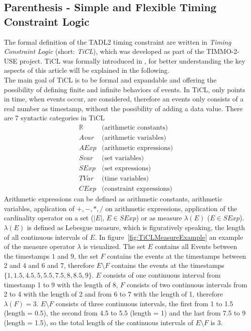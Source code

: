\subsection{Parenthesis - Simple and Flexible Timing Constraint Logic}
	The formal definition of the TADL2 timing constraint are written in \emph{Timing Constraint Logic} (short: \emph{TiCL}), which was developed as part of the TIMMO-2-USE project. TiCL was formally introduced in \cite{TiCL}, for better understanding the key aspects of this article will be explained in the following.\\
	The main goal of TiCL is to be formal and expandable and offering the possibility of defining finite and infinite behaviors of events. In TiCL, only points in time, when events occur, are considered, therefore an events only consists of a real number as timestamp, without the possibility of adding a data value. There are 7 syntactic categories in TiCL
	\begin{align*}
		\mathbb{R} &\text{(arithmetic constants)}\\
		Avar &\text{(arithmetic variables)}\\
		AExp &\text{(arithmetic expressions)}\\[10pt]
		Svar &\text{(set variables)}\\
		SExp &\text{(set expressions)}\\[10pt]
		TVar &\text{(time variables)}\\
		CExp &\text{(constraint expressions)}
	\end{align*}
	Arithmetic expressions can be defined as arithmetic constants, arithmetic variables, application of $+,-,*,/$ on arithmetic expressions, application of the cardinality operator on a set ($|E|$, $E\in SExp$) or as measure $\lambda(E)$ ($E\in SExp$). $\lambda(E)$ is defined as Lebesgue measure, which is figuratively speaking, the length of all continuous intervals of $E$. In figure~\ref{fig:TiCLMeasureExample} an example of the measure operator $\lambda$ is visualized. The set $E$ contains all Events between the timestamps $1$ and $9$, the set $F$ contains the events at the timestamps between 2 and 4 and 6 and 7, therefore $E\setminus F$ contains the events at the timestamps $\{1, 1.5, 4.5, 5, 5.5, 7.5, 8, 8.5, 9\}$.
	$E$ consists of one continuous interval from timestamp 1 to 9 with the length of 8, $F$ consists of two continuous intervals from 2 to 4 with the length of 2 and from 6 to 7 with the length of 1, therefore $\lambda(F)=3$. $E\setminus F$ consists of three continuous intervals, the first from 1 to 1.5 (length = 0.5), the second from 4.5 to 5.5 (length = 1) and the last from 7.5 to 9 (length = 1.5), so the total length of the continuous intervals of $E\setminus F$ is 3.\\
